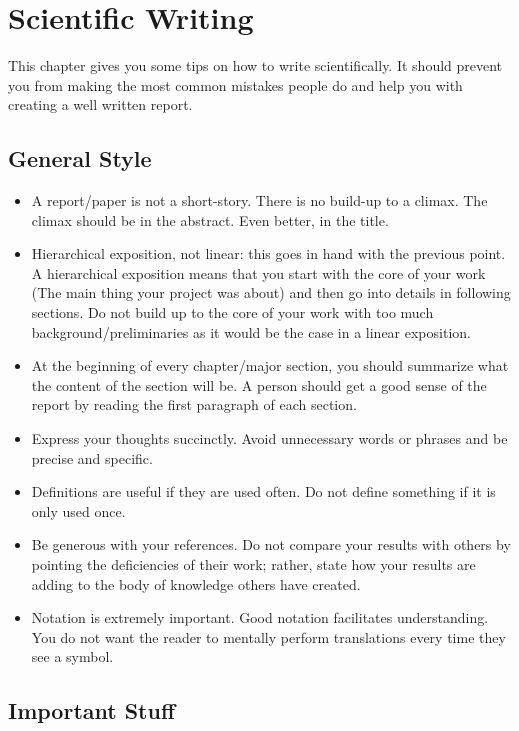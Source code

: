 \chapter{Scientific Writing}\label{chap:scientific_writing}

This chapter gives you some tips on how to write scientifically. It should prevent you from making the most common mistakes people do and help you with creating a well written report.

\section{General Style}

\begin{itemize}
	\item A report/paper is not a short-story. There is no build-up to a climax. The climax should be in the abstract. Even better, in the title.
	\item Hierarchical exposition, not linear: this goes in hand with the previous point.
	A hierarchical exposition means that you start with the core of your work (The main thing your project was about) and then go into details in following sections.
	Do not build up to the core of your work with too much background/preliminaries as it would be the case in a linear exposition.
	\item At the beginning of every chapter/major section, you should summarize what the content of the section will be.
	A person should get a good sense of the report by reading the first paragraph of each section.
	\item Express your thoughts succinctly.
	Avoid unnecessary words or phrases and be precise and specific.
	\item Definitions are useful if they are used often.
	Do not define something if it is only used once.
	\item Be generous with your references.
	Do not compare your results with others by pointing the deficiencies of their work; rather, state how your results are adding to the body of knowledge others have created.
	\item Notation is extremely important.
	Good notation facilitates understanding. You do not want the reader to mentally perform translations every time they see a symbol.
\end{itemize}

\section{Important Stuff}

